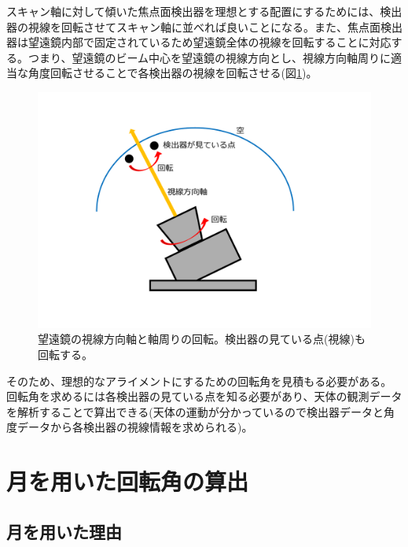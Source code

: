 スキャン軸に対して傾いた焦点面検出器を理想とする配置にするためには、検出器の視線を回転させてスキャン軸に並べれば良いことになる。また、焦点面検出器は望遠鏡内部で固定されているため望遠鏡全体の視線を回転することに対応する。つまり、望遠鏡のビーム中心を望遠鏡の視線方向とし、視線方向軸周りに適当な角度回転させることで各検出器の視線を回転させる(図\ref{boresight_axis})。
\begin{figure}[htbp]
  \centering
  \includegraphics[width=0.8\columnwidth]{5_alignment/figs/boresight_axis.pdf}
  \caption{望遠鏡の視線方向軸と軸周りの回転。検出器の見ている点(視線)も回転する。}
  \label{boresight_axis}
\end{figure}

そのため、理想的なアライメントにするための回転角を見積もる必要がある。回転角を求めるには各検出器の見ている点を知る必要があり、天体の観測データを解析することで算出できる(天体の運動が分かっているので検出器データと角度データから各検出器の視線情報を求められる)。

\section{月を用いた回転角の算出}

\subsection{月を用いた理由}

